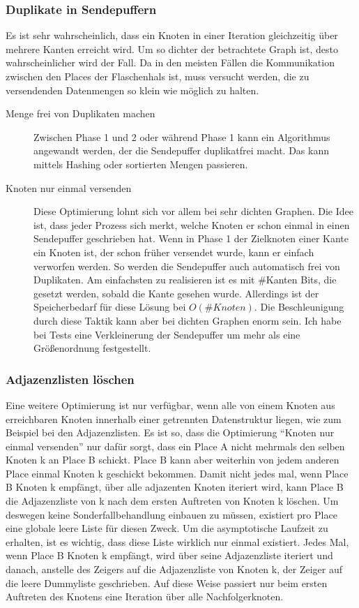 \subsubsection{Duplikate in Sendepuffern} %
\label{sub:duplikate_in_sendepuffern}
Es ist sehr wahrscheinlich, dass ein Knoten in einer Iteration gleichzeitig über mehrere Kanten erreicht wird. Um so dichter der betrachtete Graph ist, desto wahrscheinlicher wird der Fall. Da in den meisten Fällen die Kommunikation zwischen den Places der Flaschenhals ist, muss versucht werden, die zu versendenden Datenmengen so klein wie möglich zu halten. 
\begin{description}
	\item[Menge frei von Duplikaten machen] Zwischen Phase 1 und 2 oder während Phase 1 kann ein Algorithmus angewandt werden, der die Sendepuffer duplikatfrei macht. Das kann mittels Hashing oder sortierten Mengen passieren.
	\item[Knoten nur einmal versenden] Diese Optimierung lohnt sich vor allem bei sehr dichten Graphen. Die Idee ist, dass jeder Prozess sich merkt, welche Knoten er schon einmal in einen Sendepuffer geschrieben hat. Wenn in Phase 1 der Zielknoten einer Kante ein Knoten ist, der schon früher versendet wurde, kann er einfach verworfen werden. So werden die Sendepuffer auch automatisch frei von Duplikaten. Am einfachsten zu realisieren ist es mit \#Kanten Bits, die gesetzt werden, sobald die Kante gesehen wurde. Allerdings ist der Speicherbedarf für diese Lösung bei $O(\# Knoten)$. Die Beschleunigung durch diese Taktik kann aber bei dichten Graphen enorm sein. Ich habe bei Tests eine Verkleinerung der Sendepuffer um mehr als eine Größenordnung festgestellt.
\end{description}

\subsubsection{Adjazenzlisten löschen} %
\label{ssub:adjazenslisten_löschen}
Eine weitere Optimierung ist nur verfügbar, wenn alle von einem Knoten aus erreichbaren Knoten innerhalb einer getrennten Datenstruktur liegen, wie zum Beispiel bei den Adjazenzlisten. Es ist so, dass die Optimierung \enquote{Knoten nur einmal versenden} nur dafür sorgt, dass ein Place A nicht mehrmals den selben Knoten k an Place B schickt. Place B kann aber weiterhin von jedem anderen Place einmal Knoten k geschickt bekommen. Damit nicht jedes mal, wenn Place B Knoten k empfängt, über alle adjazenten Knoten iteriert wird, kann Place B die Adjazenzliste von k nach dem ersten Auftreten von Knoten k löschen. Um deswegen keine Sonderfallbehandlung einbauen zu müssen, existiert pro Place eine globale leere Liste für diesen Zweck. Um die asymptotische Laufzeit zu erhalten, ist es wichtig, dass diese Liste wirklich nur einmal existiert. Jedes Mal, wenn Place B Knoten k empfängt, wird über seine Adjazenzliste iteriert und danach, anstelle des Zeigers auf die Adjazenzliste von Knoten k, der Zeiger auf die leere Dummyliste geschrieben. Auf diese Weise passiert nur beim ersten Auftreten des Knotens eine Iteration über alle Nachfolgerknoten. 

